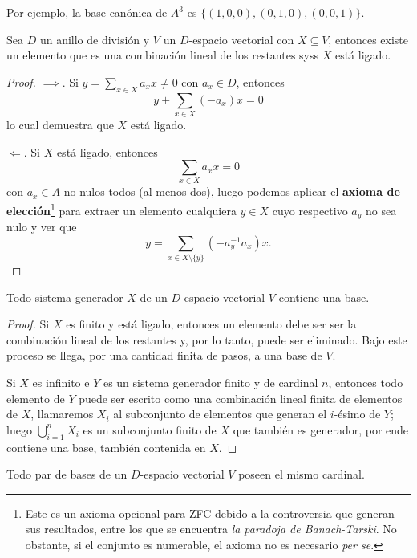 \documentclass[11pt,oneside]{book}
\begin{document}
Por ejemplo, la base canónica de $A^3$ es $\{(1,0,0), (0,1,0), (0,0,1)\}$.
\begin{thm}
Sea $D$ un anillo de división y $V$ un $D$-espacio vectorial con $X\subseteq V$, entonces existe un elemento que es una combinación lineal de los restantes syss $X$ está ligado.
\end{thm}
\begin{proof}
$\implies$. Si $y=\sum_{x\in X}a_x x\neq 0$ con $a_x\in D$, entonces
$$y+\sum_{x\in X}(-a_x)x=0$$
lo cual demuestra que $X$ está ligado.

$\Longleftarrow$. Si $X$ está ligado, entonces
$$\sum_{x\in X}a_xx=0$$
con $a_x\in A$ no nulos todos (al menos dos), luego podemos aplicar el \textbf{axioma de elección}\footnote{Este es un axioma opcional para ZFC debido a la controversia que generan sus resultados, entre los que se encuentra \textit{la paradoja de Banach-Tarski}. No obstante, si el conjunto es numerable, el axioma no es necesario \textit{per se}.} para extraer un elemento cualquiera $y\in X$ cuyo respectivo $a_y$ no sea nulo y ver que
$$y=\sum_{x\in X\setminus\{y\}}(-a_y^{-1}a_x)x.$$
\end{proof}
\begin{thm}
Todo sistema generador $X$ de un $D$-espacio vectorial $V$ contiene una base.
\end{thm}
\begin{proof}
Si $X$ es finito y está ligado, entonces un elemento debe ser ser la combinación lineal de los restantes y, por lo tanto, puede ser eliminado. Bajo este proceso se llega, por una cantidad finita de pasos, a una base de $V$.

Si $X$ es infinito e $Y$ es un sistema generador finito y de cardinal $n$, entonces todo elemento de $Y$ puede ser escrito como una combinación lineal finita de elementos de $X$, llamaremos $X_i$ al subconjunto de elementos que generan el $i$-ésimo de $Y$; luego $\bigcup_{i=1}^n X_i$ es un subconjunto finito de $X$ que también es generador, por ende contiene una base, también contenida en $X$.
\end{proof}
\begin{thm}
Todo par de bases de un $D$-espacio vectorial $V$ poseen el mismo cardinal.
\end{thm}
\end{document}
